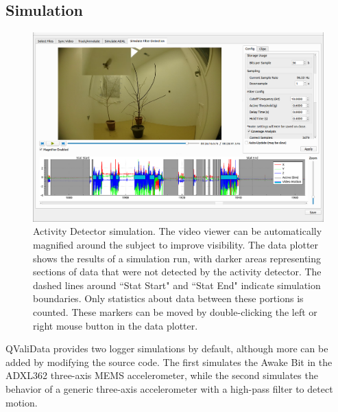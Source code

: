 \documentclass[]{article}
\begin{document}
	\subsection{Simulation}
		\begin{figure}[H]
			\centering
			\includegraphics[width=1\linewidth]{simulate}
			\caption{Activity Detector simulation. The video viewer can be automatically magnified around the subject to improve visibility. The data plotter shows the results of a simulation run, with darker areas representing sections of data that were not detected by the activity detector. The dashed lines around ``Stat Start" and ``Stat End" indicate simulation boundaries. Only statistics about data between these portions is counted. These markers can be moved by double-clicking the left or right mouse button in the data plotter.}
			\label{fig:simulate}
		\end{figure}
		QValiData provides two logger simulations by default, although more can be added by modifying the source code. The first simulates the Awake Bit in the ADXL362 three-axis MEMS accelerometer, while the second simulates the behavior of a generic three-axis accelerometer with a high-pass filter to detect motion. 
		
\end{document}
